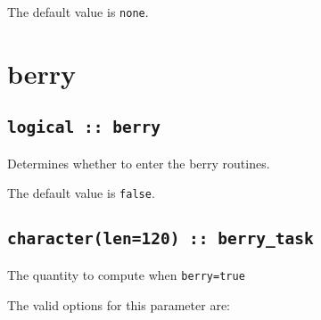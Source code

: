 The default value is {\tt none}.


\clearpage
\section{berry}

\subsection[berry]{\tt logical :: berry}
Determines whether to enter the berry routines.

The default value is \verb#false#.


\subsection[berry\_task]{\tt character(len=120) ::  berry\_task}
The quantity to compute when {\tt berry=true}

The valid options for this parameter are:

